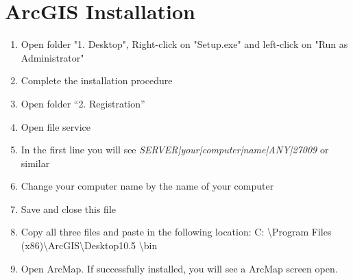 \pagestyle{fancy}
\fancyhf{}
\fancyhead[RE,LO]{\leftmark}
\fancyfoot[RE,RO]{\thepage}

\chapter{ArcGIS Installation}
\begin{enumerate}
\item{Open folder "1. Desktop", Right-click on "Setup.exe" and left-click on "Run as Administrator"}
\item{Complete the installation procedure}
\item{Open folder “2. Registration”}
\item{Open file service}
\item{In the first line you will see \emph{SERVER|your|computer|name|ANY|27009} or similar}
\item{Change your computer name by the name of your computer}
\item{Save and close this file}
\item{Copy all three files and paste in the following location: C: \textbackslash Program Files (x86)\textbackslash ArcGIS\textbackslash Desktop10.5 \textbackslash bin}
\item{Open ArcMap. If successfully installed, you will see a ArcMap screen open.}
\end{enumerate}